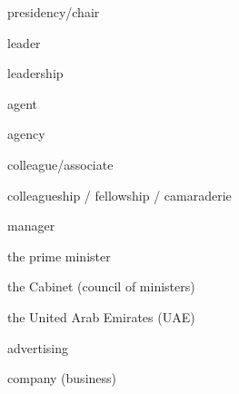 \documentclass[avery5371,grid,frame]{flashcards}
\begin{document}
\begin{flashcard}{\LARGE presidency/chair}
\LARGE {}
\end{flashcard}
\begin{flashcard}{\LARGE leader}
\LARGE {}
\end{flashcard}
\begin{flashcard}{\LARGE leadership}
\LARGE {}
\end{flashcard}
\begin{flashcard}{\LARGE agent}
\LARGE {}
\end{flashcard}
\begin{flashcard}{\LARGE agency}
\LARGE {}
\end{flashcard}
\begin{flashcard}{\LARGE colleague/associate}
\LARGE {}
\end{flashcard}
\begin{flashcard}{\LARGE colleagueship / fellowship / camaraderie}
\LARGE {}
\end{flashcard}
\begin{flashcard}{\LARGE manager}
\LARGE {}
\end{flashcard}
\begin{flashcard}{\LARGE the prime minister}
\LARGE {}
\end{flashcard}
\begin{flashcard}{\LARGE the Cabinet (council of ministers)}
\LARGE {}
\end{flashcard}
\begin{flashcard}{\LARGE the United Arab Emirates (UAE)}
\LARGE {}
\end{flashcard}
\begin{flashcard}{\LARGE advertising}
\LARGE {}
\end{flashcard}
\begin{flashcard}{\LARGE company (business)}
\LARGE {}
\end{flashcard}
\end{document}
